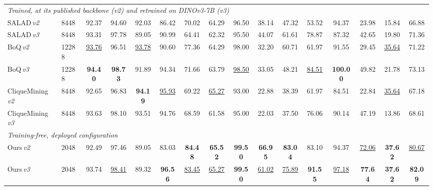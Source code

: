 \begin{table}[t]
{{\begin{tabular}{llccccccccccccc|c}
\midrule
\multicolumn{16}{l}{\emph{Trained, at its published backbone (\emph{v2}) and retrained on DINOv3-7B (\emph{v3})}} \\
SALAD\,\emph{v2} & 8448 & 92.37 & 94.60 & 92.03 & 86.42 & 70.02 & 64.29 & 96.50 & 38.14 & 47.32 & 53.52 & 94.37 & 23.98 & 15.84 & 66.88 \\
SALAD\,\emph{v3} & 8448 & 93.31 & 97.78 & 89.05 & 90.99 & 64.41 & 62.32 & 95.50 & 44.07 & 61.61 & 78.87 & 87.32 & 42.65 & 19.80 & 71.36 \\
BoQ\,\emph{v2} & 12288 & \underline{93.76} & 96.51 & \underline{93.78} & 90.60 & 77.36 & 64.29 & 98.00 & 32.20 & 60.71 & 61.97 & 91.55 & 29.45 & \underline{35.64} & 71.22 \\
BoQ\,\emph{v3} & 12288 & \textbf{94.40} & \textbf{98.73} & 91.89 & 94.34 & 71.66 & 63.79 & \underline{98.50} & 33.05 & 48.21 & \underline{84.51} & \textbf{100.00} & 49.82 & 21.78 & 73.13 \\
CliqueMining\,\emph{v2} & 8448 & 92.65 & 96.83 & \textbf{94.19} & \underline{95.93} & 69.22 & \underline{65.27} & 93.00 & 22.88 & 38.39 & 61.97 & 84.51 & 22.84 & \underline{35.64} & 67.18 \\
CliqueMining\,\emph{v3} & 8448 & 93.63 & 98.10 & 93.51 & 94.76 & 68.59 & 61.58 & 95.00 & 22.03 & 37.50 & 76.06 & 90.14 & 47.19 & 13.86 & 68.61 \\
\midrule
\multicolumn{16}{l}{\emph{Training-free, deployed configuration}} \\
Ours\,\emph{v2} & 2048 & 92.49 & 97.46 & 89.05 & 83.03 & \textbf{84.48} & \textbf{65.52} & \textbf{99.50} & \textbf{66.95} & \textbf{83.04} & 83.10 & 94.37 & \underline{72.06} & \textbf{37.62} & \underline{80.67} \\
Ours\,\emph{v3} & 2048 & 93.74 & \underline{98.41} & 89.32 & \textbf{96.56} & \underline{83.45} & \underline{65.27} & \textbf{99.50} & \underline{61.02} & \underline{75.89} & \textbf{91.55} & \underline{97.18} & \textbf{77.64} & \textbf{37.62} & \textbf{82.09} \\
\bottomrule
\end{tabular}%
}%
}
\end{table}


